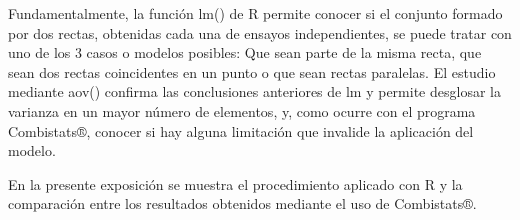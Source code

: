 Fundamentalmente, la función lm() de R permite conocer si el conjunto formado por dos rectas, obtenidas cada una de ensayos independientes, se puede tratar con uno de los 3 casos o modelos posibles: Que sean parte de la misma recta, que sean dos rectas coincidentes en un punto o que sean rectas paralelas. El estudio mediante aov() confirma las conclusiones anteriores de lm y permite desglosar la varianza en un mayor número de elementos, y, como ocurre con el programa Combistats®, conocer si hay alguna limitación que invalide la aplicación del modelo.

En la presente exposición se muestra el procedimiento aplicado con R y la comparación entre los resultados obtenidos mediante el uso de Combistats®.


%

%
